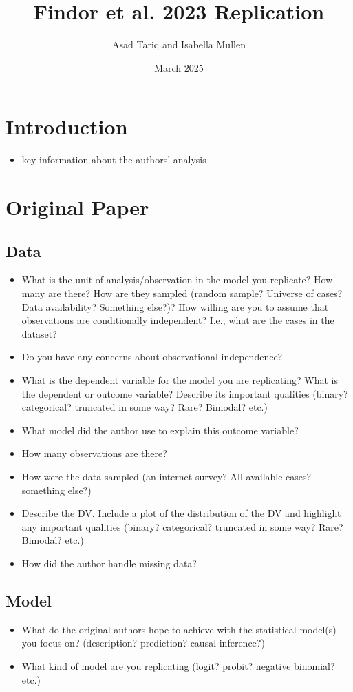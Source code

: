 \documentclass{article}
\title{Findor et al. 2023 Replication}
\author{Asad Tariq and Isabella Mullen}
\date{March 2025}
\begin{document}
\maketitle

\section{Introduction}
\begin{itemize}
\item key information about the authors’ analysis
\end{itemize}

\section{Original Paper}
\subsection{Data}
\begin{itemize}
 \item What is the unit of analysis/observation in the model you replicate?  How many are there?  How are they sampled (random sample?  Universe of cases?  Data availability? Something else?)?  How willing are you to assume that observations are conditionally independent? I.e., what are the cases in the dataset?
\item Do you have any concerns about observational independence?
\item What is the dependent variable for the model you are replicating? What is the dependent or outcome variable? Describe its important qualities (binary?  categorical?  truncated in some way? Rare? Bimodal? etc.)
\item What model did the author use to explain this outcome variable?  
\item How many observations are there?
\item How were the data sampled (an internet survey?  All available cases? something else?)
\item Describe the DV.  Include a plot of the distribution of the DV and highlight any important qualities (binary?  categorical?  truncated in some way? Rare? Bimodal? etc.)
\item How did the author handle missing data?
\end{itemize}

\subsection{Model}
\begin{itemize}
\item What do the original authors hope to achieve with the statistical model(s) you focus on? (description?  prediction? causal inference?)
\item What kind of model are you replicating (logit?  probit?  negative binomial? etc.)
\end{itemize}
\end{document}
